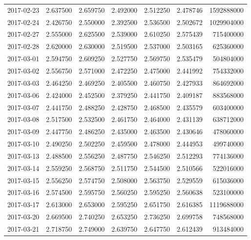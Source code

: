 \begin{tabular}{lrrrrrr}
2017-02-23 &    2.637500 &    2.659750 &    2.492000 &    2.512250 &    2.478746 &  1592888000 \\
2017-02-24 &    2.426750 &    2.550000 &    2.392500 &    2.536500 &    2.502672 &  1029904000 \\
2017-02-27 &    2.555000 &    2.625500 &    2.539000 &    2.610250 &    2.575439 &   715400000 \\
2017-02-28 &    2.620000 &    2.630000 &    2.519500 &    2.537000 &    2.503165 &   625360000 \\
2017-03-01 &    2.594750 &    2.609250 &    2.527750 &    2.569750 &    2.535479 &   504804000 \\
2017-03-02 &    2.556750 &    2.571000 &    2.472250 &    2.475000 &    2.441992 &   754332000 \\
2017-03-03 &    2.464250 &    2.469250 &    2.405500 &    2.460750 &    2.427933 &   864692000 \\
2017-03-06 &    2.424000 &    2.452500 &    2.379250 &    2.441750 &    2.409187 &   883568000 \\
2017-03-07 &    2.441750 &    2.488250 &    2.428750 &    2.468500 &    2.435579 &   603400000 \\
2017-03-08 &    2.517500 &    2.532500 &    2.461750 &    2.464000 &    2.431139 &   638712000 \\
2017-03-09 &    2.447750 &    2.486250 &    2.435000 &    2.463500 &    2.430646 &   478060000 \\
2017-03-10 &    2.490250 &    2.502250 &    2.459500 &    2.478000 &    2.444953 &   499740000 \\
2017-03-13 &    2.488500 &    2.556250 &    2.487750 &    2.546250 &    2.512293 &   774136000 \\
2017-03-14 &    2.559250 &    2.568750 &    2.511750 &    2.544500 &    2.510566 &   522016000 \\
2017-03-15 &    2.556250 &    2.574750 &    2.508000 &    2.563750 &    2.529559 &   615036000 \\
2017-03-16 &    2.574500 &    2.595750 &    2.560250 &    2.595250 &    2.560638 &   523100000 \\
2017-03-17 &    2.613000 &    2.653000 &    2.595250 &    2.651750 &    2.616385 &  1119688000 \\
2017-03-20 &    2.669500 &    2.740250 &    2.653250 &    2.736250 &    2.699758 &   748568000 \\
2017-03-21 &    2.718750 &    2.749000 &    2.639750 &    2.647750 &    2.612439 &   913484000 \\

\end{tabular}
